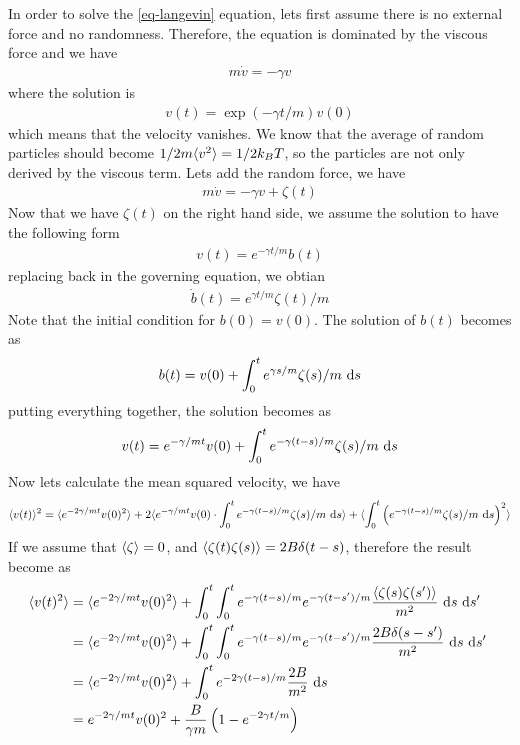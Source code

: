 In order to solve the \eqref{eq-langevin} equation, lets first assume
there is no external force and no randomness. Therefore, the equation
is dominated by the viscous force and we have
%
\begin{align}
  m \dot v = -\gamma v
\end{align}
%
where the solution is
%
\begin{align}
  v(t) = \exp(-\gamma t /m) v(0)
\end{align}
%
which means that the velocity vanishes. We know that the average of
random particles should become $1/2 m \langle v^2 \rangle = 1/2 k_BT$, so the
particles are not only derived by the viscous term. Lets add the
random force, we have
%
\begin{align}
  m\dot v = - \gamma v + \zeta (t) 
\end{align}
%
Now that we have $\zeta (t)$ on the right hand side, we assume the
solution to have the following form
%
\begin{align}
  v(t) = e^{- \gamma t /m } b(t)
\end{align}
%
replacing back in the governing equation, we obtian
%
\begin{align}
  \dot b (t) = e^{\gamma t/m}\zeta (t) /m 
\end{align}
%
Note that the initial condition for $b(0) = v(0)$. The solution of $b(t)$ becomes as
%
\begin{align}
  b(t) = v(0) + \int_0^t e^{\gamma  s/m} \zeta(s) /m ~\text{d} s 
\end{align}
%
putting everything together, the solution becomes as
%
\begin{align}
  v(t) =  e^{- \gamma/m t} v(0) + \int_0^t  e^{- \gamma (t-s)/m} \zeta (s) /m ~ \text{d} s 
\end{align}
%
Now lets calculate the mean squared velocity, we have
%
\begin{align}
  \langle v(t) \rangle ^2 =  \langle e^{- 2\gamma/m t} v(0)^2 \rangle + 2 \langle e^{- \gamma/m t} v(0)\cdot \int_0^t   e^{- \gamma (t-s)/m} \zeta (s) /m ~ \text{d} s \rangle + \langle \int_0^t  \left( e^{- \gamma (t-s)/m} \zeta (s) /m ~ \text{d} s\right) ^2 \rangle
\end{align}
%
If we assume that $\langle \zeta \rangle = 0$, and $\langle \zeta (t) \zeta (s)
\rangle = 2 B \delta (t-s)  $, therefore the result become as
%
\begin{align}
  \langle v(t)^{2} \rangle & = \langle e^{- 2\gamma/m t} v(0)^2 \rangle + \int_0^t \int _0^t  e^{- \gamma (t-s)/m} e^{- \gamma (t-s')/m} \frac{ \langle \zeta (s) \zeta (s') \rangle}{m^2} ~ \text{d} s ~ \text{d} s' ~  \\
                  & = \langle e^{- 2\gamma/m t} v(0)^2 \rangle + \int_0^t \int _0^t  e^{- \gamma (t-s)/m} e^{- \gamma (t-s')/m} \frac{ 2 B \delta (s-s') }{m^2} ~ \text{d} s ~ \text{d} s' ~ \\
                  & = \langle e^{- 2\gamma/m t} v(0)^2 \rangle +  \int_0^t   e^{- 2\gamma (t-s)/m} \frac{ 2 B }{m^2} ~ \text{d} s \\
  &  = e^{- 2\gamma/m t} v(0)^2  + \frac{B}{\gamma m} \left( 1 - e^{-2\gamma t/m }\right)
\end{align}













